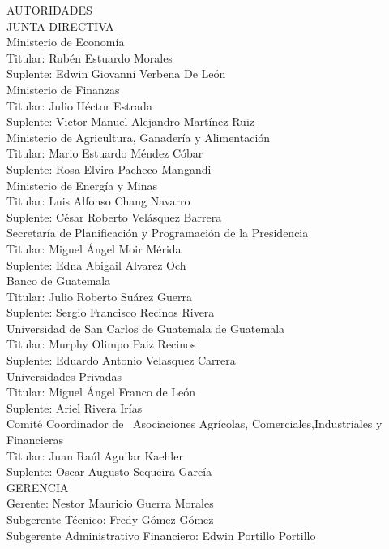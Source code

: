 \begin{center}
	{\Bold \LARGE AUTORIDADES}\\[1cm]
	
	
	{\Bold \large \color{color1!89!black} JUNTA  DIRECTIVA} \\[0.4cm]
	
	{ \Bold Ministerio de Economía}          \\
	Titular: Rubén Estuardo Morales   \\
	Suplente: Edwin Giovanni Verbena De León   \\ [0.4cm]
	
	{\Bold Ministerio de Finanzas} \\
	Titular: Julio Héctor Estrada \\
	Suplente: Victor Manuel Alejandro Martínez Ruiz\\[0.4cm]
	
	{\Bold Ministerio de Agricultura, Ganadería y Alimentación} \\
	Titular: Mario Estuardo Méndez Cóbar   \\
	Suplente: Rosa Elvira Pacheco Mangandi \\ [0.4cm]
	
	{\Bold Ministerio de Energía y Minas}\\
	Titular: Luis Alfonso Chang Navarro  \\
	Suplente: César Roberto Velásquez Barrera \\ [0.4cm]
	{\Bold Secretaría de Planificación y Programación de la Presidencia}   \\
	Titular: Miguel Ángel Moir Mérida  \\
	Suplente:  Edna Abigail Alvarez Och\\ [0.4cm]
	{\Bold Banco de Guatemala} \\
	Titular: Julio Roberto Suárez Guerra \\
	Suplente: Sergio Francisco Recinos Rivera\\ [0.4cm]
	{\Bold Universidad de San Carlos de Guatemala de Guatemala} \\
	Titular: Murphy Olimpo Paiz Recinos   \\
	Suplente: Eduardo Antonio Velasquez Carrera   \\ [0.4cm]
	{\Bold Universidades Privadas} \\
	Titular: Miguel Ángel Franco de León \\             Suplente: Ariel Rivera Irías\\ [0.4cm]
	{\Bold Comité Coordinador de \ Asociaciones  Agrícolas, Comerciales,Industriales y Financieras} \\
	Titular: Juan Raúl Aguilar Kaehler \\
	Suplente:  Oscar Augusto Sequeira García  \\ [0.4cm]
	
	{\Bold \large \color{color1!89!black} GERENCIA}\\[0.2cm]
	Gerente:  Nestor Mauricio Guerra Morales        \\
	Subgerente Técnico:  Fredy Gómez Gómez\\
	Subgerente Administrativo Financiero:  Edwin Portillo Portillo\\
\end{center}
\clearpage

